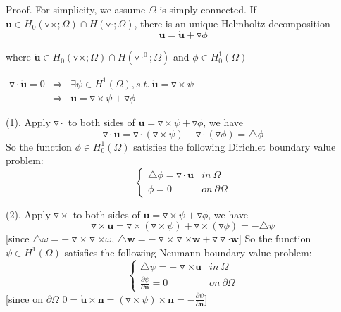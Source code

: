 \documentclass[a4paper,11pt]{article}
\begin{document}
Proof. For simplicity, we assume $\Omega$ is simply connected.
\newline If $\mathbf{u}\in H_0(\triangledown\times;\Omega)\cap H(\triangledown\cdot;\Omega)$, there is an unique Helmholtz decomposition \[\mathbf{u} = \mathring{\mathbf{u}} + \triangledown{\phi}\]

where $\mathring{\mathbf{u}}\in H_0(\triangledown\times;\Omega)\cap H(\triangledown\cdot^0;\Omega)$ and $\phi\in H_{0}^{1}(\Omega)$
\begin{center}
$\begin{array}{ccc}
\triangledown\cdot\mathring{\mathbf{u}} = 0 & \Rightarrow & \exists\psi\in H^1(\Omega), s.t.\ \mathring{\mathbf{u}} = \triangledown\times\psi \\
& \Rightarrow & \mathbf{u} = \triangledown\times\psi + \triangledown\phi
\end{array}$
\end{center}

(1). Apply $\triangledown\cdot$ to both sides of $\mathbf{u} = \triangledown\times\psi + \triangledown\phi$, we have
\[\triangledown\cdot\mathbf{u} = \triangledown\cdot(\triangledown\times\psi) + \triangledown\cdot(\triangledown\phi) = \triangle\phi\]
So the function $\phi\in H_0^1(\Omega)$ satisfies the following Dirichlet boundary value problem:
\begin{equation}\label{eq:Dirichlet}
\left\{\begin{array}{cc}
\triangle\phi = \triangledown\cdot\mathbf{u} &  in\ \Omega \\
\phi = 0  & on\ \partial\Omega
\end{array}\right.
\end{equation}

(2). Apply $\triangledown\times$ to both sides of $\mathbf{u} = \triangledown\times\psi + \triangledown\phi$, we have
\[\triangledown\times\mathbf{u} = \triangledown\times(\triangledown\times\psi) + \triangledown\times(\triangledown\phi) = -\triangle\psi\]
[since $\triangle\omega = - \triangledown\times\triangledown\times\omega$,
$\triangle\mathbf{w} = - \triangledown\times\triangledown\times\mathbf{w} + \triangledown\triangledown\cdot\mathbf{w}$]\newline
So the function $\psi\in H^1(\Omega)$ satisfies the following Neumann boundary value problem:
\begin{equation}\label{eq:Neumann}
\left\{\begin{array}{cc}
\triangle\psi = - \triangledown\times\mathbf{u} &  in\ \Omega \\
\frac{\partial\psi}{\partial\mathbf{n}} = 0  & on\ \partial\Omega
\end{array}\right.
\end{equation}
[since on $\partial\Omega$ $0 = \mathring{\mathbf{u}}\times\mathbf{n} = (\triangledown\times\psi)\times\mathbf{n} = -\frac{\partial\psi}{\partial\mathbf{n}}$]
\end{document}
